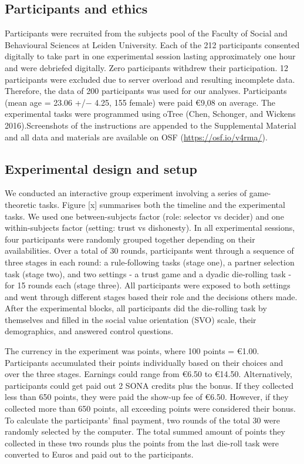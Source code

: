 \documentclass[man]{apa6}
\begin{document}
\hypertarget{participants-and-ethics}{%
\subsection{Participants and ethics}\label{participants-and-ethics}}

Participants were recruited from the subjects pool of the Faculty of
Social and Behavioural Sciences at Leiden University. Each of the 212
participants consented digitally to take part in one experimental
session lasting approximately one hour and were debriefed digitally.
Zero participants withdrew their participation. 12 participants were
excluded due to server overload and resulting incomplete data.
Therefore, the data of 200 participants was used for our analyses.
Participants (mean age = 23.06 +/− 4.25, 155 female) were paid €9,08 on
average. The experimental tasks were programmed using oTree (Chen,
Schonger, and Wickens 2016).Screenshots of the instructions are appended
to the Supplemental Material and all data and materials are available on
OSF (\url{https://osf.io/v4rma/}).

\hypertarget{experimental-design-and-setup}{%
\subsection{Experimental design and
setup}\label{experimental-design-and-setup}}

We conducted an interactive group experiment involving a series of
game-theoretic tasks. Figure {[}x{]} summarises both the timeline and
the experimental tasks. We used one between-subjects factor (role:
selector vs decider) and one within-subjects factor (setting: trust vs
dishonesty). In all experimental sessions, four participants were
randomly grouped together depending on their availabilities. Over a
total of 30 rounds, participants went through a sequence of three stages
in each round: a rule-following tasks (stage one), a partner selection
task (stage two), and two settings - a trust game and a dyadic
die-rolling task - for 15 rounds each (stage three). All participants
were exposed to both settings and went through different stages based
their role and the decisions others made. After the experimental blocks,
all participants did the die-rolling task by themselves and filled in
the social value orientation (SVO) scale, their demographics, and
answered control questions.

The currency in the experiment was points, where 100 points = €1.00.
Participants accumulated their points individually based on their
choices and over the three stages. Earnings could range from €6.50 to
€14.50. Alternatively, participants could get paid out 2 SONA credits
plus the bonus. If they collected less than 650 points, they were paid
the show-up fee of €6.50. However, if they collected more than 650
points, all exceeding points were considered their bonus. To calculate
the participants' final payment, two rounds of the total 30 were
randomly selected by the computer. The total summed amount of points
they collected in these two rounds plus the points from the last
die-roll task were converted to Euros and paid out to the participants.
\end{document}
